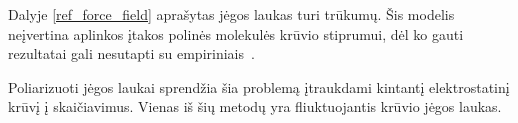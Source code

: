 Dalyje \ref{ref_force_field} aprašytas jėgos laukas turi trūkumų.
Šis modelis neįvertina aplinkos įtakos polinės molekulės krūvio stiprumui, dėl ko gauti rezultatai gali nesutapti su empiriniais~\cite{ref_pol}.

Poliarizuoti jėgos laukai sprendžia šia problemą įtraukdami kintantį elektrostatinį krūvį į skaičiavimus.
Vienas iš šių metodų yra fliuktuojantis krūvio jėgos laukas.

